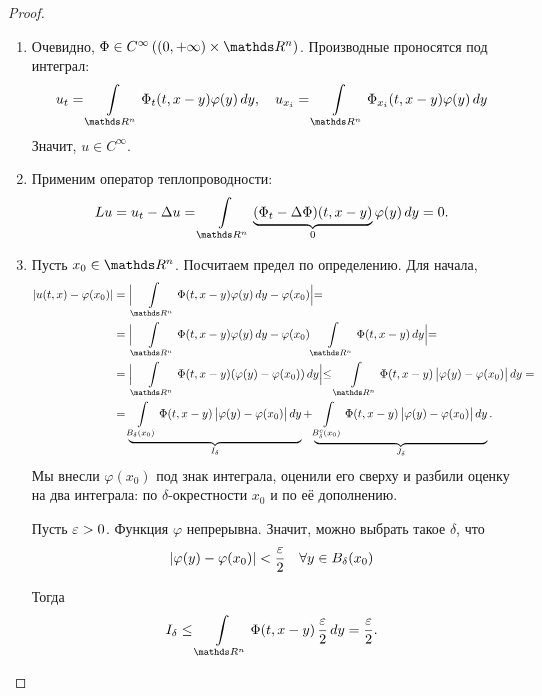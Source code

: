 \begin{proof}
\begin{enumerate} 
\item Очевидно, $\Phi \in  C^\infty\left(\left(0, +\infty\right)\times \real^n\right)$. Производные проносятся под интеграл:
$$u_t = \int\limits_{\real^n} \Phi_t(t,x-y)\varphi(y) \, dy, \quad u_{x_i} = \int\limits_{\real^n} \Phi_{x_i}(t, x-y)\varphi(y) \, dy$$
Значит, $u \in C^\infty.$
\item Применим оператор теплопроводности: $$Lu = u_t - \Delta u = \int\limits_{\real^n} \underbrace{(\Phi_t - \Delta \Phi)(t, x-y)}_{0}\varphi(y) \, dy = 0.$$
\item Пусть $x_0 \in \real^n$. Посчитаем предел по определению. Для начала,
\begin{align*}
|u(t,x) - \varphi(x_0)| &= \Bigl| \int \limits_{\real^n} \Phi(t, x-y) \varphi(y) \, dy - \varphi(x_0) \Bigl| = \\
	&= \Bigl| \int \limits_{\real^n} \Phi(t, x-y) \varphi(y) \, dy - \varphi(x_0) \int \limits_{\real^n} \Phi(t, x-y) \, dy\Bigl|= \\
	&= \Bigl| \int \limits_{\real^n} \Phi(t, x-y) (\varphi(y) - \varphi(x_0)) \, dy \Bigl| \leq \int \limits_{\real^n} \Phi(t, x-y) \, \bigl| \varphi(y) - \varphi(x_0) \bigl| \, dy = \\
	&= \underbrace {\int \limits_{B_\delta (x_0)} \Phi(t, x-y) \, \bigl| \varphi(y) - \varphi(x_0) \bigl| \, dy}_{I_\delta} + \underbrace {\int \limits_{B^c_\delta (x_0)} \Phi(t, x-y) \, \bigl| \varphi(y) - \varphi(x_0) \bigl| \, dy}_{J_\delta}.
\end{align*}
Мы внесли $\varphi(x_0)$ под знак интеграла, оценили его сверху и разбили оценку на два интеграла: по $\delta$-окрестности $x_0$ и по её дополнению.

Пусть $\varepsilon > 0$. Функция $\varphi$ непрерывна. Значит, можно выбрать такое $\delta$, что 
$$ | \varphi(y) - \varphi(x_0)| < \dfrac {\varepsilon} {2} \quad \forall y \in B_\delta (x_0)$$

Тогда
$$ I_\delta \leq \int \limits_{\real^n} \Phi(t, x-y) \, \frac {\eps} {2} \, dy = \frac {\eps} {2}. $$


\end{enumerate}
\end{proof}
